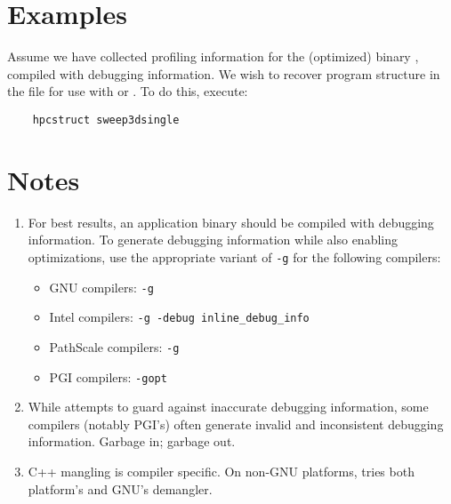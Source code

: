 \documentclass[english]{article}
\begin{document}
\section{Examples}

Assume we have collected profiling information for the (optimized) binary , compiled with debugging information.
We wish to recover program structure in the file  for use with  or .
To do this, execute:
\begin{verbatim}
    hpcstruct sweep3dsingle
\end{verbatim}


\section{Notes}

\begin{enumerate}

\item For best results, an application binary should be compiled with debugging information.
To generate debugging information while also enabling optimizations, use the appropriate variant of \verb+-g+ for the following compilers:
\begin{itemize}
\item GNU compilers: \verb+-g+
\item Intel compilers: \verb+-g -debug inline_debug_info+
\item PathScale compilers: \verb+-g+
\item PGI compilers: \verb+-gopt+
\end{itemize}

\item While  attempts to guard against inaccurate debugging information, some compilers (notably PGI's) often generate invalid and inconsistent debugging information.
Garbage in; garbage out.

\item C++ mangling is compiler specific. On non-GNU platforms, 
tries both platform's and GNU's demangler.

\end{enumerate}
\end{document}
